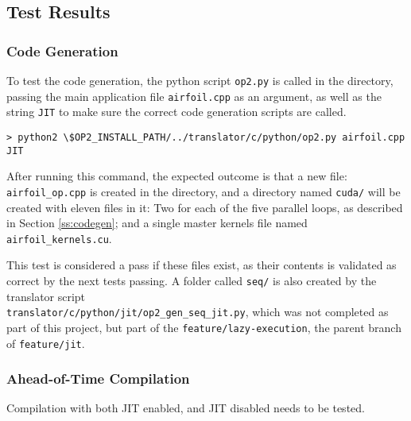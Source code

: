 \subsection{Test Results}

\subsubsection{Code Generation}
To test the code generation, the python script \verb|op2.py| is called in the directory, passing the main application file \verb|airfoil.cpp| as an argument, as well as the string \verb|JIT| to make sure the correct code generation scripts are called.
\begin{verbatim}
> python2 \$OP2_INSTALL_PATH/../translator/c/python/op2.py airfoil.cpp JIT
\end{verbatim}
After running this command, the expected outcome is that a new file: \verb|airfoil_op.cpp| is created in the directory, and a directory named \verb|cuda/| will be created with eleven files in it: Two for each of the five parallel loops, as described in Section \ref{ss:codegen}; and a single master kernels file named \verb|airfoil_kernels.cu|.
\par
This test is considered a pass if these files exist, as their contents is validated as correct by the next tests passing. A folder called \verb|seq/| is also created by the translator script\\
 \verb|translator/c/python/jit/op2_gen_seq_jit.py|, which was not completed as part of this project, but part of the \verb|feature/lazy-execution|, the parent branch of \verb|feature/jit|.


\subsubsection{Ahead-of-Time Compilation}
Compilation with both JIT enabled, and JIT disabled needs to be tested.

